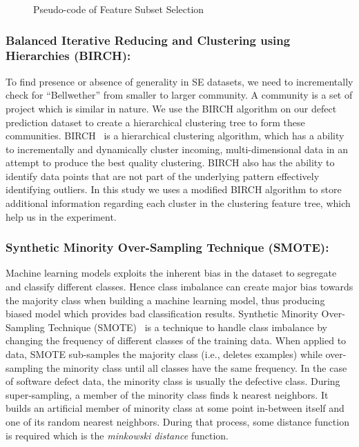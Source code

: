 \documentclass[10pt,journal,compsoc]{IEEEtran}
\begin{document}
{\small 
\begin{figure}[]
    \small 
    \inputminted[numbersep=2pt, linenos=true, fontsize=\small]{python}{pseudocode/cfs.py}
    \vspace{-0.2cm}
    \caption{Pseudo-code of Feature Subset Selection}
    \label{fig:GAP_pseudocode} 
    \vspace{-0.3cm}
\end{figure}
}
\subsubsection{\textbf{Balanced Iterative Reducing and Clustering using Hierarchies (BIRCH):}}
\label{subsec:BIRCH}
To find presence or absence of generality in SE datasets, we need to incrementally check for ``Bellwether'' from smaller to larger community. A community is a set of project which is similar in nature. We use the BIRCH algorithm on our defect prediction dataset to create a hierarchical clustering tree to form these communities. BIRCH~\cite{zhang1996birch} is  a hierarchical clustering algorithm, which has a ability to incrementally and dynamically cluster incoming, multi-dimensional data in an attempt to produce the best quality clustering. BIRCH also has the ability to identify data points that are not part of the underlying pattern effectively identifying outliers. In this study we uses a modified BIRCH algorithm to store additional information regarding each cluster in the clustering feature tree, which help us in the experiment.

\subsubsection{\textbf{Synthetic Minority Over-Sampling Technique (SMOTE):}}
\label{subsec:SMOTE}

Machine learning models exploits the inherent bias in the dataset to segregate and classify different classes. Hence class imbalance can create major bias towards the majority class when building a machine learning model, thus producing biased model which provides bad classification results. Synthetic Minority Over-Sampling Technique (SMOTE)~\cite{chawla2002smote} is a technique to handle class imbalance by changing the frequency of different classes of the training data. When applied to data, SMOTE sub-samples the majority class (i.e., deletes examples) while over-sampling the minority class until all classes have the same frequency. In the case of software defect data, the minority class is usually the defective class. During super-sampling, a member of the minority class finds k nearest neighbors. It builds an artificial member of minority class at some point in-between itself and one of its random nearest neighbors. During that process, some distance function is required which is the \textit{minkowski distance} function.
\end{document}

